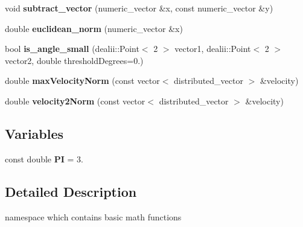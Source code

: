 \begin{DoxyCompactItemize}
\item 
\hypertarget{namespacenatrium_1_1Math_aa836548ce124ae68fe267d0c988add9b}{void {\bfseries subtract\-\_\-vector} (numeric\-\_\-vector \&x, const numeric\-\_\-vector \&y)}\label{namespacenatrium_1_1Math_aa836548ce124ae68fe267d0c988add9b}

\item 
\hypertarget{namespacenatrium_1_1Math_a3fbf64e851a081a568d1fce928380074}{double {\bfseries euclidean\-\_\-norm} (numeric\-\_\-vector \&x)}\label{namespacenatrium_1_1Math_a3fbf64e851a081a568d1fce928380074}

\item 
\hypertarget{namespacenatrium_1_1Math_a55469b55d9a0f80edfed2aecb95fe73d}{bool {\bfseries is\-\_\-angle\-\_\-small} (dealii\-::\-Point$<$ 2 $>$ vector1, dealii\-::\-Point$<$ 2 $>$ vector2, double threshold\-Degrees=0.)}\label{namespacenatrium_1_1Math_a55469b55d9a0f80edfed2aecb95fe73d}

\item 
\hypertarget{namespacenatrium_1_1Math_a9e700098d3aab2d0e0ed0b5be4b1137a}{double {\bfseries max\-Velocity\-Norm} (const vector$<$ distributed\-\_\-vector $>$ \&velocity)}\label{namespacenatrium_1_1Math_a9e700098d3aab2d0e0ed0b5be4b1137a}

\item 
\hypertarget{namespacenatrium_1_1Math_a4d98cdb7fc5423722f75bf6e6440a1d3}{double {\bfseries velocity2\-Norm} (const vector$<$ distributed\-\_\-vector $>$ \&velocity)}\label{namespacenatrium_1_1Math_a4d98cdb7fc5423722f75bf6e6440a1d3}

\end{DoxyCompactItemize}
\subsection*{Variables}
\begin{DoxyCompactItemize}
\item 
\hypertarget{namespacenatrium_1_1Math_a1ef5edf004cf147f3b3e9d36a7af4b00}{const double {\bfseries P\-I} = 3.}\label{namespacenatrium_1_1Math_a1ef5edf004cf147f3b3e9d36a7af4b00}

\end{DoxyCompactItemize}


\subsection{Detailed Description}
namespace which contains basic math functions 